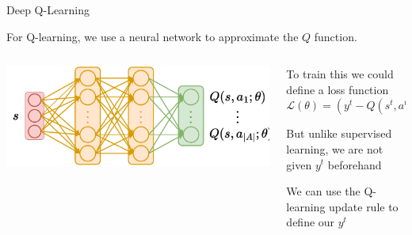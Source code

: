 \begin{frame}[t]{Deep Q-Learning}

For Q-learning, we use a neural network to approximate the $Q$ function.
\vspace{5pt}
\begin{columns}
    \begin{column}{0.4\textwidth}
    \vspace{0pt}%
        \includegraphics[width=\textwidth]{images/chapter_8/dqn_architecture.pdf}
    \end{column}\hfill
    \begin{column}{0.6\textwidth}
    \vspace{0pt}%
        \blist
            \item<1-> To train this we could define a loss function $\mathcal{L}(\theta) = \left(y^t - Q(s^t,a^t;\theta) \right)$
            \item<1-> But unlike supervised learning, we are not given $y^t$ beforehand
            \item <2->We can use the Q-learning update rule to define our $y^t$
        \elist
    \end{column}    
\end{columns}   


\end{frame}

